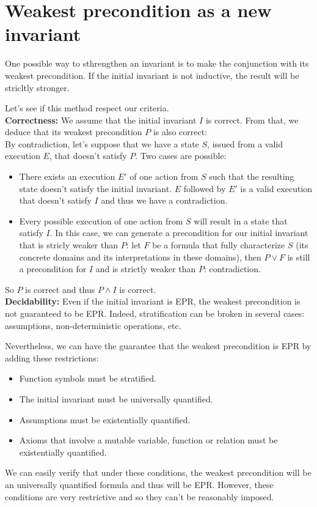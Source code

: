 \documentclass[11pt,a4paper,oldfontcommands,openany]{memoir}
\begin{document}
    \section{Weakest precondition as a new invariant}

    One possible way to sthrengthen an invariant is to make the conjunction with its weakest precondition.
    If the initial invariant is not inductive, the result will be stricltly stronger.

    Let's see if this method respect our criteria.\\
    
    \textbf{Correctness:} We assume that the initial invariant \(I\) is correct. From that, we deduce that its weakest precondition \(P\) is also correct:
    \\

    By contradiction, let's suppose that we have a state \(S\), issued from a valid execution \(E\), that doesn't satisfy \(P\).
    Two cases are possible:
    \begin{itemize}
        \item There exists an execution \(E'\) of one action from \(S\) such that the resulting state doesn't satisfy the initial invariant.
        \(E\) followed by \(E'\) is a valid execution that doesn't satisfy \(I\) and thus we have a contradiction.
        \item Every possible execution of one action from \(S\) will result in a state that satisfy \(I\).
        In this case, we can generate a precondition for our initial invariant that is stricly weaker than \(P\):
        let \(F\) be a formula that fully characterize \(S\) (its concrete domains and its interpretations in these domains),
        then \(P \lor F\) is still a precondition for \(I\) and is strictly weaker than \(P\): contradiction. 
    \end{itemize}

    So \(P\) is correct and thus \(P \land I\) is correct.\\

    \textbf{Decidability:} Even if the initial invariant is EPR, the weakest precondition is not guaranteed to be EPR.
    Indeed, stratification can be broken in several cases: assumptions, non-deterministic operations, etc.

    Nevertheless, we can have the guarantee that the weakest precondition is EPR by adding these restrictions:
    \begin{itemize}
        \item Function symbols must be stratified.
        \item The initial invariant must be universally quantified.
        \item Assumptions must be existentially quantified.
        \item Axioms that involve a mutable variable, function or relation must be existentially quantified.
    \end{itemize}
    We can easily verify that under these conditions, the weakest precondition will be an universally quantified formula
    and thus will be EPR. However, these conditions are very restrictive and so they can't be reasonably imposed.
    \\
\end{document}
